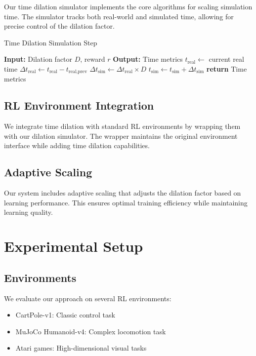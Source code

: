 \documentclass[11pt,twocolumn]{article}
\newcommand{\dilationfactor}{D}
\begin{document}
Our time dilation simulator implements the core algorithms for scaling simulation time. The simulator tracks both real-world and simulated time, allowing for precise control of the dilation factor.

\begin{algorithm}
\caption{Time Dilation Simulation Step}
\begin{algorithmic}[1]
\STATE \textbf{Input:} Dilation factor $\dilationfactor$, reward $r$
\STATE \textbf{Output:} Time metrics
\STATE $t_{\text{real}} \leftarrow$ current real time
\STATE $\Delta t_{\text{real}} \leftarrow t_{\text{real}} - t_{\text{real,prev}}$
\STATE $\Delta t_{\text{sim}} \leftarrow \Delta t_{\text{real}} \times \dilationfactor$
\STATE $t_{\text{sim}} \leftarrow t_{\text{sim}} + \Delta t_{\text{sim}}$
\STATE \textbf{return} Time metrics
\end{algorithmic}
\end{algorithm}

\subsection{RL Environment Integration}

We integrate time dilation with standard RL environments by wrapping them with our dilation simulator. The wrapper maintains the original environment interface while adding time dilation capabilities.

\subsection{Adaptive Scaling}

Our system includes adaptive scaling that adjusts the dilation factor based on learning performance. This ensures optimal training efficiency while maintaining learning quality.

\section{Experimental Setup}

\subsection{Environments}

We evaluate our approach on several RL environments:
\begin{itemize}
    \item CartPole-v1: Classic control task
    \item MuJoCo Humanoid-v4: Complex locomotion task
    \item Atari games: High-dimensional visual tasks
\end{itemize}
\end{document}
